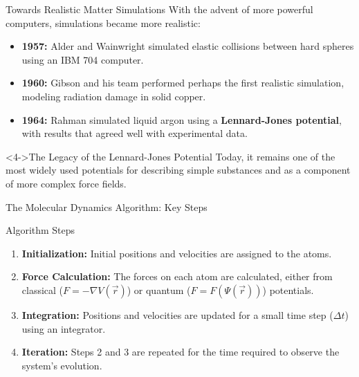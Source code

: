 \begin{frame}{Towards Realistic Matter Simulations}
    \footnotesize
    With the advent of more powerful computers, simulations became more realistic:
    \pause
    
    \begin{itemize}
        \item \textbf{1957:} Alder and Wainwright simulated elastic collisions between hard spheres using an IBM 704 computer.
        \pause
        \bigskip
        \item \textbf{1960:} Gibson and his team performed perhaps the first realistic simulation, modeling radiation damage in solid copper.
        \pause
        \bigskip
        \item \textbf{1964:} Rahman simulated liquid argon using a \textbf{Lennard-Jones potential}, with results that agreed well with experimental data.
    \end{itemize}
    \pause
    
    \begin{alertblock}<4->{The Legacy of the Lennard-Jones Potential}
        Today, it remains one of the most widely used potentials for describing simple substances and as a component of more complex force fields.
    \end{alertblock}
\end{frame}

\begin{frame}{The Molecular Dynamics Algorithm: Key Steps}
    \begin{block}{Algorithm Steps}
        \begin{enumerate}
            \item \textbf{Initialization:} Initial positions and velocities are assigned to the atoms.
            \pause
            \item \textbf{Force Calculation:} The forces on each atom are calculated, either from classical ($F = -\nabla V(\vec{r})$) or quantum ($F = F(\Psi(\vec{r}))$) potentials.
            \pause
            \item \textbf{Integration:} Positions and velocities are updated for a small time step ($\Delta t$) using an integrator.
            \pause
            \item \textbf{Iteration:} Steps 2 and 3 are repeated for the time required to observe the system's evolution.
        \end{enumerate}
    \end{block}
\end{frame}

